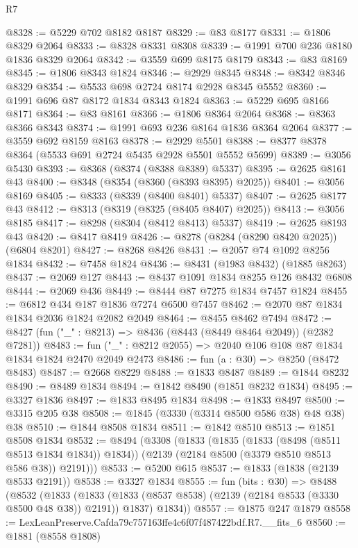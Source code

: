 \begin{lexlean}{R7}
\begin{coremodule}
@8328 := @5229 @702 @8182 @8187
@8329 := @83 @8177
@8331 := @1806 @8329 @2064
@8333 := @8328 @8331 @8308
@8339 := @1991 @700 @236 @8180 @1836 @8329 @2064
@8342 := @3559 @699 @8175 @8179
@8343 := @83 @8169
@8345 := @1806 @8343 @1824
@8346 := @2929 @8345
@8348 := @8342 @8346 @8329
@8354 := @5533 @698 @2724 @8174 @2928 @8345 @5552
@8360 := @1991 @696 @87 @8172 @1834 @8343 @1824
@8363 := @5229 @695 @8166 @8171
@8364 := @83 @8161
@8366 := @1806 @8364 @2064
@8368 := @8363 @8366 @8343
@8374 := @1991 @693 @236 @8164 @1836 @8364 @2064
@8377 := @3559 @692 @8159 @8163
@8378 := @2929 @5501
@8388 := @8377 @8378 @8364 (@5533 @691 @2724 @5435 @2928 @5501 @5552 @5699)
@8389 := @3056 @5430
@8393 := @8368 (@8374 (@8388 @8389) @5337)
@8395 := @2625 @8161 @43
@8400 := @8348 (@8354 (@8360 (@8393 @8395) @2025))
@8401 := @3056 @8169
@8405 := @8333 (@8339 (@8400 @8401) @5337)
@8407 := @2625 @8177 @43
@8412 := @8313 (@8319 (@8325 (@8405 @8407) @2025))
@8413 := @3056 @8185
@8417 := @8298 (@8304 (@8412 @8413) @5337)
@8419 := @2625 @8193 @43
@8420 := @8417 @8419
@8426 := @8278 (@8284 (@8290 @8420 @2025)) (@6804 @8201)
@8427 := @8268 @8426
@8431 := @2057 @74 @1092 @8256 @1834
@8432 := @7458 @1824
@8436 := @8431 (@1983 @8432) (@1885 @8263)
@8437 := @2069 @127
@8443 := @8437 @1091 @1834 @8255 @126 @8432 @6808
@8444 := @2069 @436
@8449 := @8444 @87 @7275 @1834 @7457 @1824
@8455 := @6812 @434 @187 @1836 @7274 @6500 @7457
@8462 := @2070 @87 @1834 @1834 @2036 @1824 @2082 @2049
@8464 := @8455 @8462 @7494
@8472 := @8427 (fun ("_" : @8213) => @8436 (@8443 (@8449 @8464 @2049)) (@2382 @7281))
@8483 := fun ("_" : @8212 @2055) => @2040 @106 @108 @87 @1834 @1834 @1824 @2470 @2049 @2473
@8486 := fun (a : @30) => @8250 (@8472 @8483)
@8487 := @2668 @8229
@8488 := @1833 @8487
@8489 := @1844 @8232
@8490 := @8489 @1834
@8494 := @1842 @8490 (@1851 @8232 @1834)
@8495 := @3327 @1836
@8497 := @1833 @8495 @1834
@8498 := @1833 @8497
@8500 := @3315 @205 @38
@8508 := @1845 (@3330 (@3314 @8500 @586 @38) @48 @38) @38
@8510 := @1844 @8508 @1834
@8511 := @1842 @8510
@8513 := @1851 @8508 @1834
@8532 := @8494
    (@3308
      (@1833
        (@1835 (@1833 (@8498 (@8511 @8513 @1834 @1834)) @1834))
        (@2139 (@2184 @8500 (@3379 @8510 @8513 @586 @38)) @2191)))
@8533 := @5200 @615
@8537 := @1833 (@1838 (@2139 @8533 @2191))
@8538 := @3327 @1834
@8555 := fun (bits : @30) =>
  @8488
    (@8532
      (@1833
        (@1833 (@1833 (@8537 @8538) (@2139 (@2184 @8533 (@3330 @8500 @48 @38)) @2191)) @1837)
        @1834))
@8557 := @1875 @247 @1879
@8558 := LexLeanPreserve.Cafda79c757163ffe4c6f07f487422bdf.R7.__fits_6
@8560 := @1881 (@8558 @1808)

\end{coremodule}
\end{lexlean}
